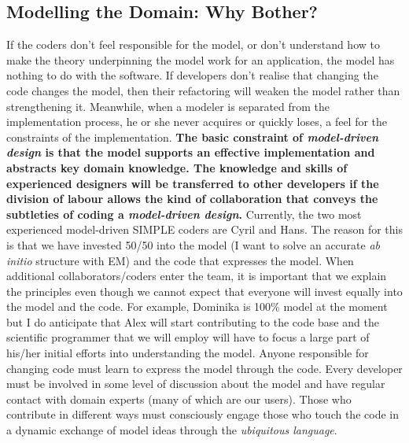 \documentclass[a4paper,11pt]{article}
\begin{document}
\subsection{Modelling the Domain: Why Bother?}
If the coders don't feel responsible for the model, or don't understand how to make the theory underpinning the model work for an application, the model has nothing to do with the software. If developers don't realise that changing the code changes the model, then their refactoring will weaken the model rather than strengthening it. Meanwhile, when a modeler is separated from the implementation process, he or she never acquires or quickly loses, a feel for the constraints of the implementation. \textbf{The basic constraint of \textit{model-driven design} is that the model supports an effective implementation and abstracts key domain knowledge. The knowledge and skills of experienced designers will  be transferred to other developers if the division of labour allows the kind of collaboration that conveys the subtleties of coding a \textit{model-driven design}.} Currently, the two most experienced model-driven SIMPLE coders are Cyril and Hans. The reason for this is that we have invested 50/50 into the model (I want to solve an accurate \textit{ab initio} structure with EM) and the code that expresses the model. When additional collaborators/coders enter the team, it is important that we explain the principles even though we cannot expect that everyone will invest equally into the model and the code. For example, Dominika is 100\% model at the moment but I do anticipate that Alex will start contributing to the code base and the scientific programmer that we will employ will have to focus a large part of his/her initial efforts into understanding the model. Anyone responsible for changing code must learn to express the model through the code. Every developer must be involved in some level of discussion about the model and have regular contact with domain experts (many of which are our users). Those who contribute in different ways must consciously engage those who touch the code in a dynamic exchange of model ideas through the \textit{ubiquitous language}.
\end{document}
